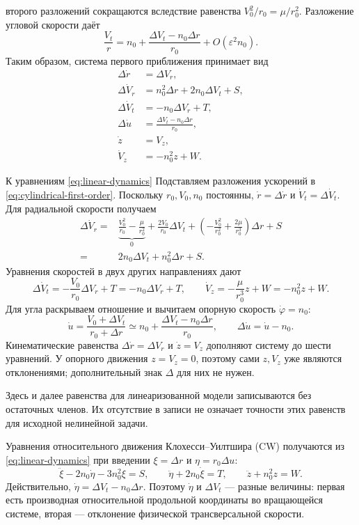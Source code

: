 \documentclass[a4paper,11pt]{article}
\numberwithin{equation}{section}
\theoremstyle{remark}
\begin{document}
второго разложений сокращаются вследствие равенства
$V_0^2/r_0=\mu/r_0^2$. Разложение угловой скорости даёт
\[
 \frac{{V_t}}{{r}}=n_0+\frac{{\Delta V_t-n_0\Delta r}}{{r_0}}
 +O(\varepsilon^2n_0).
\]
Таким образом, система первого приближения принимает вид
\begin {equation}
 \boxed{\begin {aligned}
  \Delta\dot r&=\Delta V_r,\\
  \Delta\dot V_r&=n_0^2\Delta r+2n_0\Delta V_t+S,\\
  \Delta\dot V_t&=-n_0\Delta V_r+T,\\
  \Delta\dot u&=\frac{{\Delta V_t-n_0\Delta r}}{{r_0}},\\
  \dot z&=V_z,\\
  \dot V_z&=-n_0^2z+W.
 \end {aligned}}
 \label {eq:linear-dynamics}
\end {equation}
\begin{explanation}{К уравнениям \eqref{eq:linear-dynamics}}
Подставляем разложения ускорений в
\eqref{eq:cylindrical-first-order}. Поскольку $r_0,V_0,n_0$
постоянны, $\dot r=\Delta\dot r$ и $\dot V_t=\Delta\dot V_t$.
Для радиальной скорости получаем
\[
\begin{aligned}
\Delta\dot V_r={}&
\underbrace{\frac{V_0^2}{r_0}-\frac{\mu}{r_0^2}}_{0}
+\frac{2V_0}{r_0}\Delta V_t
+\left(-\frac{V_0^2}{r_0^2}+\frac{2\mu}{r_0^3}\right)\Delta r+S\\
={}&2n_0\Delta V_t+n_0^2\Delta r+S.
\end{aligned}
\]
Уравнения скоростей в двух других направлениях дают
\[
\Delta\dot V_t=-\frac{V_0}{r_0}\Delta V_r+T
             =-n_0\Delta V_r+T,\qquad
\dot V_z=-\frac{\mu}{r_0^3}z+W=-n_0^2z+W.
\]
Для угла раскрываем отношение и вычитаем опорную скорость
$\dot\varphi=n_0$:
\[
\dot u=\frac{V_0+\Delta V_t}{r_0+\Delta r}
\simeq n_0+\frac{\Delta V_t-n_0\Delta r}{r_0},\qquad
\Delta\dot u=\dot u-n_0.
\]
Кинематические равенства $\Delta\dot r=\Delta V_r$ и
$\dot z=V_z$ дополняют систему до шести уравнений.
У опорного движения $z=V_z=0$, поэтому сами $z,V_z$ уже являются
отклонениями; дополнительный знак $\Delta$ для них не нужен.
\end{explanation}

Здесь и далее равенства для линеаризованной модели записываются без
остаточных членов. Их отсутствие в записи не означает точности
этих равенств для исходной нелинейной задачи.

Уравнения относительного движения Клохесси--Уилтшира (CW)
получаются из \eqref{eq:linear-dynamics} при введении $\xi=\Delta r$ и $\eta=r_0\Delta u$:
\begin {equation}
 \ddot\xi-2n_0\dot\eta-3n_0^2\xi=S,\qquad
 \ddot\eta+2n_0\dot\xi=T,\qquad
 \ddot z+n_0^2z=W.
 \label {eq:hill-equations}
\end {equation}
Действительно, $\dot\eta=\Delta V_t-n_0\Delta r$.
Поэтому $\dot\eta$ и $\Delta V_t$ --- разные величины: первая
есть производная относительной продольной координаты во вращающейся
системе, вторая --- отклонение физической трансверсальной скорости.
\end{document}
